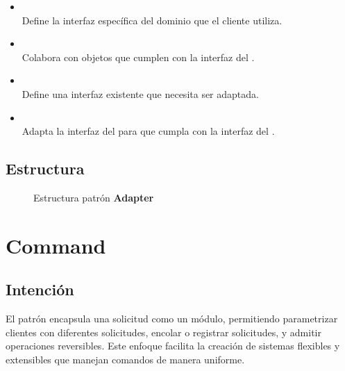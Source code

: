
\begin{itemize}
\item \Objetivo\\
Define la interfaz específica del dominio que el cliente utiliza.
\item \Clientes\\
Colabora con objetos que cumplen con la interfaz del \Objetivo.
\item \Adaptable\\
Define una interfaz existente que necesita ser adaptada.
\item \Adaptador\\
Adapta la interfaz del \Adaptable para que cumpla con la interfaz del \Objetivo.
\end{itemize}

\subsection*{Estructura}

\begin{figure}[H]
\caption{Estructura patrón \textbf{Adapter}}
\begin{center}
\end{center}
\end{figure}


\section{Command}
\label{anexoCommand}


\subsection*{Intención}

El patrón encapsula una solicitud como un módulo, permitiendo parametrizar clientes con diferentes solicitudes, encolar o registrar solicitudes, y admitir operaciones reversibles. Este enfoque facilita la creación de sistemas flexibles y extensibles que manejan comandos de manera uniforme.

